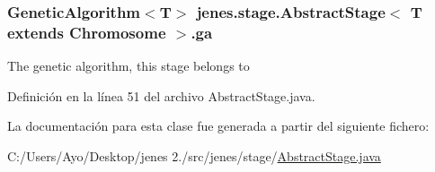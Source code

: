 \hypertarget{classjenes_1_1stage_1_1_abstract_stage_3_01_t_01extends_01_chromosome_01_4_a751aba4f46b29d22592d48422ffa75f9}{
\subsubsection[{ga}]{\setlength{\rightskip}{0pt plus 5cm}Genetic\-Algorithm$<$T$>$ jenes.\-stage.\-Abstract\-Stage$<$ T extends Chromosome $>$.ga\hspace{0.3cm}{\ttfamily [protected]}}}\label{classjenes_1_1stage_1_1_abstract_stage_3_01_t_01extends_01_chromosome_01_4_a751aba4f46b29d22592d48422ffa75f9}
The genetic algorithm, this stage belongs to 

Definición en la línea 51 del archivo Abstract\-Stage.\-java.



La documentación para esta clase fue generada a partir del siguiente fichero\-:\begin{DoxyCompactItemize}
\item 
C\-:/\-Users/\-Ayo/\-Desktop/jenes 2./src/jenes/stage/\hyperlink{_abstract_stage_8java}{Abstract\-Stage.\-java}\end{DoxyCompactItemize}
